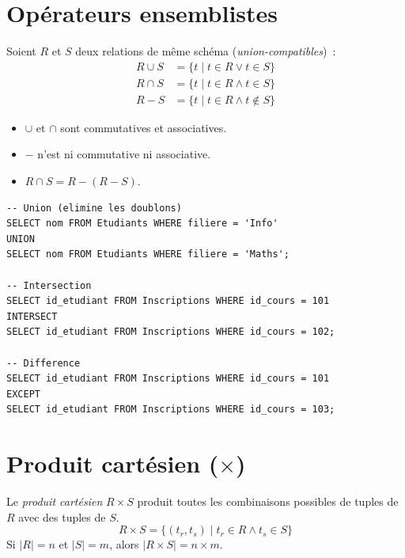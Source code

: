 \section{Op\'erateurs ensemblistes}

\begin{definition}
Soient $R$ et $S$ deux relations de m\^eme sch\'ema (\emph{union-compatibles})~:
\begin{align}
R \cup S &= \{ t \mid t \in R \lor t \in S \} \tag{union}\\
R \cap S &= \{ t \mid t \in R \land t \in S \} \tag{intersection}\\
R - S &= \{ t \mid t \in R \land t \notin S \} \tag{diff\'erence}
\end{align}
\end{definition}

\begin{theoreme}
\begin{itemize}
    \item $\cup$ et $\cap$ sont commutatives et associatives.
    \item $-$ n'est ni commutative ni associative.
    \item $R \cap S = R - (R - S)$.
\end{itemize}
\end{theoreme}

\begin{codeblock}[title=\textbf{Op\'erateurs ensemblistes en SQL}]
\begin{verbatim}
-- Union (elimine les doublons)
SELECT nom FROM Etudiants WHERE filiere = 'Info'
UNION
SELECT nom FROM Etudiants WHERE filiere = 'Maths';

-- Intersection
SELECT id_etudiant FROM Inscriptions WHERE id_cours = 101
INTERSECT
SELECT id_etudiant FROM Inscriptions WHERE id_cours = 102;

-- Difference
SELECT id_etudiant FROM Inscriptions WHERE id_cours = 101
EXCEPT
SELECT id_etudiant FROM Inscriptions WHERE id_cours = 103;
\end{verbatim}
\end{codeblock}

\section{Produit cart\'esien ($\times$)}

\begin{definition}
Le \emph{produit cart\'esien} $R \times S$ produit toutes les combinaisons possibles
de tuples de $R$ avec des tuples de $S$.
\[
R \times S = \{ (t_r, t_s) \mid t_r \in R \land t_s \in S \}
\]
Si $|R| = n$ et $|S| = m$, alors $|R \times S| = n \times m$.
\end{definition}

